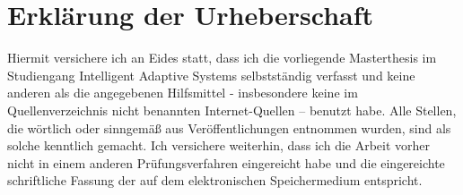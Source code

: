 \documentclass[12pt,final,twoside]{report}
\newcommand{\trtype}{Masterthesis} %
\newcommand{\trcourseofstudies}{Intelligent Adaptive Systems} %
\theoremstyle{plain}
\theoremstyle{definition}
\theoremstyle{remark}
\begin{document}
\fancyhead[LE]{\it \leftmark}           %
\fancyhead[RO]{\it \rightmark}          %
\fancyhead[LO,RE]{}                     %



\cleardoublepage


\cleardoublepage


\cleardoublepage


\cleardoublepage


\cleardoublepage


\cleardoublepage

\appendix
\fancyhead[LO,RE]{}                      %


\cleardoublepage


% 
\printbibliography
\cleardoublepage

\vspace{2cm}
\chapter*{Erkl\"arung der Urheberschaft}
\label{sec:urheber}
Hiermit versichere ich an Eides statt, dass ich die vorliegende
\trtype{} im Studiengang \trcourseofstudies{}
selbstst{\"a}ndig verfasst und keine anderen als die angegebenen
Hilfsmittel - insbesondere keine im Quellenverzeichnis nicht
benannten Internet-Quellen – benutzt habe. Alle Stellen, die
w{\"o}rtlich oder sinngem{\"a}{\ss} aus Ver{\"o}ffentlichungen entnommen wurden,
sind als solche kenntlich gemacht. Ich versichere weiterhin, dass
ich die Arbeit vorher nicht in einem anderen Pr{\"u}fungsverfahren
eingereicht habe und die eingereichte schriftliche Fassung der
auf dem elektronischen Speichermedium entspricht.
\end{document}
